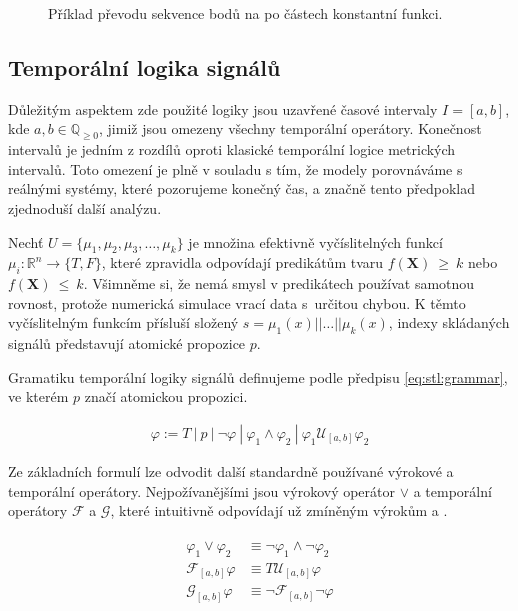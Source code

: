 \begin{figure}[h!]
\begin{center}
\end{center}
\caption{Příklad převodu sekvence bodů na po částech konstantní funkci.}
\end{figure}

\subsection{Temporální logika signálů}\label{section:stl}
Důležitým aspektem zde použité logiky jsou uzavřené časové intervaly $I = [a, b]$, kde $a, b \in \mathbb{Q}_{\geq0}$,
jimiž jsou omezeny všechny temporální operátory. Konečnost intervalů je jedním z rozdílů
oproti klasické temporální logice metrických intervalů. Toto omezení je plně v souladu s tím,
že modely porovnáváme s reálnými systémy, které pozorujeme konečný čas, a značně tento předpoklad
zjedno\-du\-ší další analýzu.

Nechť $U = \{\mu_1, \mu_2, \mu_3, \ldots, \mu_k\}$ je množina efektivně vyčíslitelných funkcí
$\mu_i: \mathbb{R}^n \rightarrow \{T, F\}$, které zpravidla odpovídají predikátům tvaru
$f(\mathbf{X})~\geq~k$ nebo $f(\mathbf{X})~\leq~k$. Všimněme si, že nemá smysl v predikátech
používat samotnou rovnost, protože numerická simulace vrací data s~určitou chybou.
K těmto vyčíslitelným funkcím přísluší složený $s = \mu_1(x)|| \ldots|| \mu_k(x)$,
indexy skládaných signálů představují atomické propozice $p$.

Gramatiku temporální logiky signálů definujeme podle předpisu \ref{eq:stl:grammar},
ve kterém $p$ značí atomickou propozici.

\begin{align}\label{eq:stl:grammar}
\varphi := T~|~p~|~\neg\varphi~|~\varphi_1 \wedge \varphi_2~|~\varphi_1\mathcal{U}_{[a,b]}\varphi_2
\end{align}

Ze základních formulí lze odvodit další standardně používané výrokové a temporální operátory.
Nejpožívanějšími jsou výrokový operátor $\vee$ a temporální operátory $\mathcal{F}$ a $\mathcal{G}$,
které intuitivně odpovídají už zmíněným výrokům  a .

\begin{align}\label{eq:stl:other}
\begin{array}{ll}
\varphi_1\vee\varphi_2 		&\equiv \neg\varphi_1 \wedge \neg\varphi_2		\\
\mathcal{F}_{[a,b]}\varphi 	&\equiv T\mathcal{U}_{[a,b]}\varphi				\\
\mathcal{G}_{[a,b]}\varphi 	&\equiv \neg\mathcal{F}_{[a,b]}\neg\varphi		\\
\end{array}
\end{align}

